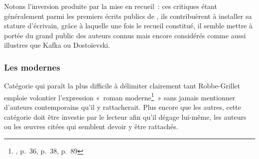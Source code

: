 \documentclass[12pt, a4paper]{article}
\begin{document}
Notons l'inversion produite par la mise en recueil~: ces critiques étant généralement parmi les premiers écrits publics de \robbe, ils contribuèrent à installer sa stature d'écrivain, grâce à laquelle une fois le recueil constitué, il semble mettre à portée du grand public des auteurs connus mais encore considérés comme aussi illustres que Kafka ou Dostoïevski.




\subsubsection{Les modernes}


Catégorie qui paraît la plus difficile à délimiter clairement tant Robbe-Grillet emploie volontier l'expression «~roman moderne\footnote{, p.~36, p.~38, p.~89}~» sans jamais mentionner d'auteurs contemporains qu'il y rattacherait. Plus encore que les autres, cette catégorie doit être investie par le lecteur afin qu'il dégage lui-même, les auteurs ou les œuvres citées qui semblent devoir y être rattachés.
\end{document}
